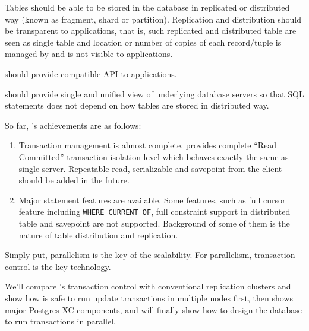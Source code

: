   Tables should be able to be stored in the database in replicated or distributed way
  (known as fragment, shard or partition).
  Replication and distribution should be transparent to applications,
  that is, such replicated and distributed table are seen as single table
  and location or number of copies of each record/tuple is managed by
  \XC{} and is not visible to applications.

  \XC{} should provide compatible \PG{} API to applications.

  \XC{} should provide single and unified view of underlying \PG{} database servers
  so that SQL statements does not depend on how tables are stored in distributed way.

  So far, \XC's achievements are as follows:

  \begin{enumerate}

    \item Transaction management is almost complete.
		\PG{} provides complete ``Read Committed'' transaction isolation level
		which behaves exactly the same as single \PG{} server.
		Repeatable read, serializable and
		savepoint from the client should be added in the future.

    \item Major statement features are available.
		Some features, such as full cursor feature including \texttt{WHERE CURRENT OF},
		full constraint support in distributed table and savepoint are not supported.
		Background of some of them is the nature of table distribution and replication.
  
  \end{enumerate}




  Simply put, parallelism is the key of the scalability.
  For parallelism, transaction control is the key technology.
  
  We'll compare \PG's transaction control with conventional replication clusters
  and show how \XC{} is safe to run update transactions in multiple nodes first,
  then shows major Postgres-XC components,
  and will finally show how to design the database to run transactions in parallel.



